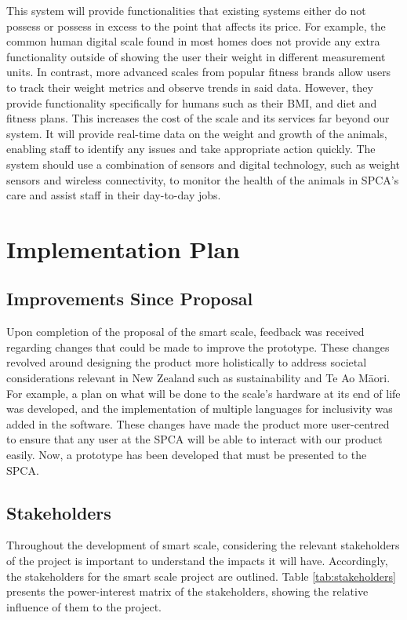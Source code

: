 This system will provide functionalities that existing systems either do not possess or possess in excess to the point that affects its price. For example, the common human digital scale found in most homes does not provide any extra functionality outside of showing the user their weight in different measurement units. In contrast, more advanced scales from popular fitness brands allow users to track their weight metrics and observe trends in said data. However, they provide functionality specifically for humans such as their BMI, and diet and fitness plans. This increases the cost of the scale and its services far beyond our system. It will provide real-time data on the weight and growth of the animals, enabling staff to identify any issues and take appropriate action quickly. The system should use a combination of sensors and digital technology, such as weight sensors and wireless connectivity, to monitor the health of the animals in SPCA’s care and assist staff in their day-to-day jobs.


\chapter{Implementation Plan}

\section{Improvements Since Proposal}

Upon completion of the proposal of the smart scale, feedback was received regarding changes that could be made to improve the prototype. These changes revolved around designing the product more holistically to address societal considerations relevant in New Zealand such as sustainability and Te Ao Māori. For example, a plan on what will be done to the scale’s hardware at its end of life was developed, and the implementation of multiple languages for inclusivity was added in the software. These changes have made the product more user-centred to ensure that any user at the SPCA will be able to interact with our product easily. Now, a prototype has been developed that must be presented to the SPCA.

\section{Stakeholders}

Throughout the development of smart scale, considering the relevant stakeholders of the project is important to understand the impacts it will have. Accordingly, the stakeholders for the smart scale project are outlined. Table \ref{tab:stakeholders} presents the power-interest matrix of the stakeholders, showing the relative influence of them to the project.



